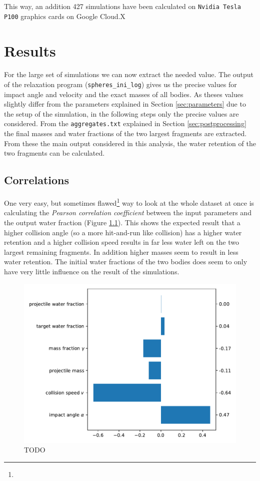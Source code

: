 This way, an addition \num{427} simulations have been calculated on \texttt{Nvidia Tesla P100} graphics cards on Google Cloud.X

\chapter{Results}

For the large set of simulations we can now extract the needed value. The output of the relaxation program (\texttt{spheres\_ini\_log}) gives us the precise values for impact angle and velocity and the exact masses of all bodies. As theses values slightly differ from the parameters explained in Section \ref{sec:parameters} due to the setup of the simulation, in the following steps only the precise values are considered. From the \texttt{aggregates.txt} explained in Section \ref{sec:postprocessing} the final masses and water fractions of the two largest fragments are extracted. From these the main output considered in this analysis, the water retention of the two fragments can be calculated. 


\section{Correlations}
\label{sec:cov}
One very easy, but sometimes flawed\footnote{} way to look at the whole dataset at once is calculating the \textit{Pearson correlation coefficient} between the input parameters and the output water fraction (Figure \ref{fig:cov}). This shows the expected result that a higher collision angle (so a more hit-and-run like collision) has a higher water retention and a higher collision speed results in far less water left on the two largest remaining fragments. In addition higher masses seem to result in less water retention. The initial water fractions of the two bodies does seem to only have very little influence on the result of the simulations.

\begin{figure}[h] %
	\centering
	\includegraphics[width=0.8\linewidth]{images/cov.pdf}
	\caption{TODO}
	\label{fig:cov}
\end{figure}

